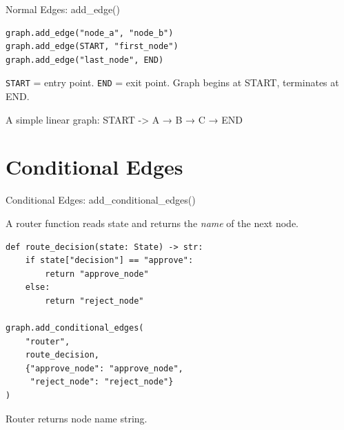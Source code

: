 \documentclass[aspectratio=169,11pt]{beamer}
\begin{document}
\begin{frame}[fragile,t]{Normal Edges: add\_edge()}
\vspace{0.1cm}

\begin{codebox}
\begin{lstlisting}
graph.add_edge("node_a", "node_b")
graph.add_edge(START, "first_node")
graph.add_edge("last_node", END)
\end{lstlisting}
\end{codebox}

\vspace{0.15cm}

\begin{tipbox}
\texttt{START} = entry point. \texttt{END} = exit point. Graph begins at START, terminates at END.
\end{tipbox}

\vspace{0.15cm}

{\footnotesize A simple linear graph: START -> A → B → C → END}
\end{frame}

\section{Conditional Edges}
\begin{frame}[fragile,t]{Conditional Edges: add\_conditional\_edges()}
\vspace{0.05cm}

\begin{conceptbox}
A router function reads state and returns the \textit{name} of the next node.
\end{conceptbox}

\vspace{0.1cm}

\begin{codebox}[Example]
\begin{lstlisting}
def route_decision(state: State) -> str:
    if state["decision"] == "approve":
        return "approve_node"
    else:
        return "reject_node"

graph.add_conditional_edges(
    "router",
    route_decision,
    {"approve_node": "approve_node",
     "reject_node": "reject_node"}
)
\end{lstlisting}
\end{codebox}

{\footnotesize Router returns node name string.}
\end{frame}
\end{document}
